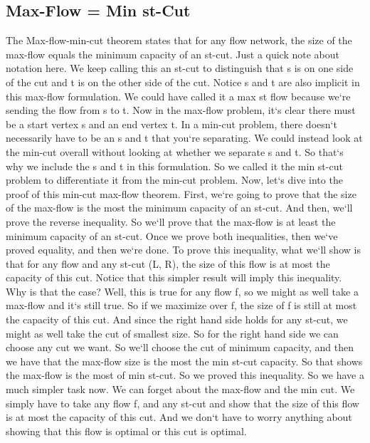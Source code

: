 \subsection{Max-Flow = Min st-Cut}
The Max-flow-min-cut theorem states that for any flow network, the size of the max-flow equals the minimum capacity of an st-cut.
Just a quick note about notation here.
We keep calling this an st-cut to distinguish that s is on one side of the cut and t is on the other side of the cut.
Notice s and t are also implicit in this max-flow formulation.
We could have called it a max st flow because we`re sending the flow from s to t.
Now in the max-flow problem, it`s clear there must be a start vertex s and an end vertex t.
In a min-cut problem, there doesn`t necessarily have to be an s and t that you`re separating.
We could instead look at the min-cut overall without looking at whether we separate s and t.
So that`s why we include the s and t in this formulation.
So we called it the min st-cut problem to differentiate it from the min-cut problem.
Now, let`s dive into the proof of this min-cut max-flow theorem.
First, we`re going to prove that the size of the max-flow is the most the minimum capacity of an st-cut.
And then, we`ll prove the reverse inequality.
So we`ll prove that the max-flow is at least the minimum capacity of an st-cut.
Once we prove both inequalities, then we`ve proved equality, and then we`re done.
To prove this inequality, what we`ll show is that for any flow and any st-cut (L, R), the size of this flow is at most the capacity of this cut.
Notice that this simpler result will imply this inequality.
Why is that the case? Well, this is true for any flow f, so we might as well take a max-flow and it`s still true.
So if we maximize over f, the size of f is still at most the capacity of this cut.
And since the right hand side holds for any st-cut, we might as well take the cut of smallest size.
So for the right hand side we can choose any cut we want.
So we`ll choose the cut of minimum capacity, and then we have that the max-flow size is the most the min st-cut capacity.
So that shows the max-flow is the most of min st-cut.
So we proved this inequality.
So we have a much simpler task now.
We can forget about the max-flow and the min cut.
We simply have to take any flow f, and any st-cut and show that the size of this flow is at most the capacity of this cut.
And we don`t have to worry anything about showing that this flow is optimal or this cut is optimal.

